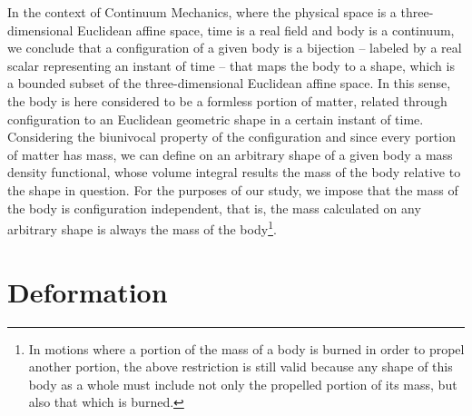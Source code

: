 In the context of Continuum Mechanics, where the physical space is a three-dimensional Euclidean affine space, time is a real field and body is a continuum, we conclude that a configuration of a given body is a bijection -- labeled by a real scalar representing an instant of time -- that maps the body to a shape, which is a bounded subset of the three-dimensional Euclidean affine space. In this sense, the body is here considered to be a formless portion of matter, related through configuration to an Euclidean geometric shape in a certain instant of time. Considering the biunivocal property of the configuration and since every portion of matter has mass, we can define on an arbitrary shape of a given body a mass density functional, whose volume integral results the mass of the body relative to the shape in question. For the purposes of our study, we impose that the mass of the body is configuration independent, that is, the mass calculated on any arbitrary shape is always the mass of the body\footnote{In motions where a portion of the mass of a body is burned in order to propel another portion, the above restriction is still valid because any shape of this body as a whole must include not only the propelled portion of its mass, but also that which is burned.}.


\section{Deformation}

